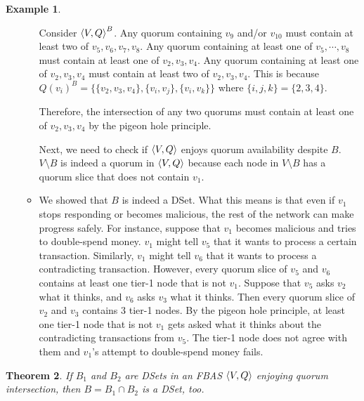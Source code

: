 \documentclass[12pt, psamsfonts]{amsart}
\newtheorem{thm}{Theorem}[subsection]
\theoremstyle{definition}
\newtheorem{exmp}[thm]{Example}
\theoremstyle{remark}
\numberwithin{equation}{subsection}
\begin{document}
\begin{exmp}
\begin{itemize}
\begin{itemize}
                    Consider $\ev{V, Q}^B$.
                    Any quorum containing $v_9$ and/or $v_{10}$ must contain at least two of $v_5, v_6, v_7, v_8$.
                    Any quorum containing at least one of $v_5, \cdots, v_8$ must contain at least one of $v_2, v_3, v_4$.
                    Any quorum containing at least one of $v_2, v_3, v_4$ must contain at least two of $v_2, v_3, v_4$.
                    This is because $Q(v_i)^B = \{ \{ v_2, v_3, v_4 \}, \{ v_i, v_j \}, \{ v_i, v_k \} \}$ where $\{ i, j, k \} = \{ 2, 3, 4 \}$.

                    Therefore, the intersection of any two quorums must contain at least one of $v_2, v_3, v_4$ by the pigeon hole principle.

                    Next, we need to check if $\ev{V, Q}$ enjoys quorum availability despite $B$.
                    $V \setminus B$ is indeed a quorum in $\ev{V, Q}$ because each node in $V \setminus B$ has a quorum slice that does not contain $v_1$.
                \item
                    We showed that $B$ is indeed a DSet.
                    What this means is that even if $v_1$ stops responding or becomes malicious, the rest of the network can make progress safely.
                    For instance, suppose that $v_1$ becomes malicious and tries to double-spend money.
                    $v_1$ might tell $v_5$ that it wants to process a certain transaction.
                    Similarly, $v_1$ might tell $v_6$ that it wants to process a contradicting transaction.
                    However, every quorum slice of $v_5$ and $v_6$ contains at least one tier-1 node that is not $v_1$.
                    Suppose that $v_5$ asks $v_2$ what it thinks, and $v_6$ asks $v_3$ what it thinks.
                    Then every quorum slice of $v_2$ and $v_3$ contains 3 tier-1 nodes.
                    By the pigeon hole principle, at least one tier-1 node that is not $v_1$ gets asked what it thinks about the contradicting transactions from $v_5$.
                    The tier-1 node does not agree with them and $v_1$'s attempt to double-spend money fails.
            \end{itemize}
    \end{itemize}
\end{exmp}

\begin{thm}\label{intersection_dset}
    If $B_1$ and $B_2$ are DSets in an FBAS $\ev{V, Q}$ enjoying quorum intersection, then $B = B_1 \cap B_2$ is a DSet, too.
\end{thm}
\end{document}
